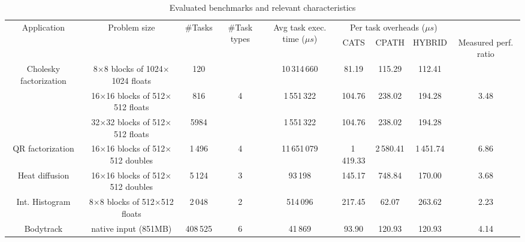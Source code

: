 \footnotesize
\begin{table}
\begin{center}
\caption{Evaluated benchmarks and relevant characteristics}
\label{tab.apps}
\begin{tabular}{|c|c|c|c|c|c|c|c|c|}
\hline
\multirow{2}{*}{\parbox{22mm}{\centering Application}} & 
\multirow{2}{*}{Problem size} & 
\multirow{2}{*}{\parbox{11mm}{\centering \#Tasks}} & 
\multirow{2}{*}{\parbox{9mm}{\centering \#Task types}} & 
\multirow{2}{*}{\parbox{18mm}{\centering Avg task exec. time (${\mu}s$)}} & 
\multicolumn{3}{|c|}{Per task overheads (${\mu}s$)} &\\
\cline{6-8}
& & & & & {\parbox{10mm}{\centering CATS}} & {\parbox{10mm}{\centering CPATH}} & {\parbox{10mm}{\centering HYBRID}} &

\multirow{2}{*}{\parbox{13mm}{\centering Measured perf. ratio}} \\
& & & & & & & & \\ %
\hline

\multirow{3}{*}{\parbox{25mm}{\centering Cholesky factorization}} & 
8$\times$8 blocks of 1024$\times$1024 floats & 120 & & 10\,314\,660 & 81.19 &  115.29 &  112.41 &  \\                                              & 16$\times$16 blocks of 512$\times$512 floats & 816 & 4 & 1\,551\,322 & 104.76 &  238.02 &  194.28 &3.48 \\ 
& 32$\times$32 blocks of 512$\times$512 floats & 5984 & & 1\,551\,322 & 104.76 &  238.02 &  194.28  & \\ 
\hline{}
QR factorization & 16$\times$16 blocks of 512$\times$512 doubles & 1\,496 & 4 & 11\,651\,079  &   1\,419.33 & 2\,580.41 &   1\,451.74 & 6.86 \\ 
\hline
Heat diffusion & 16$\times$16 blocks of 512$\times$512 doubles & 5\,124 & 3 & 93\,198  &   145.17  &  748.84 &  170.00& 3.68 \\
\hline
Int. Histogram & 8$\times$8 blocks of 512$\times$512 floats & 2\,048 & 2 & 514\,096 &  217.45 &  62.07 & 263.62  & 2.23 \\ 
\hline
Bodytrack & native input (851MB) & 408\,525 &  6 & 41\,869 & 93.90 & 120.93 &  120.93 & 4.14 \\
\hline
\end{tabular} 
\end{center}
\vspace{-0.4cm}
\end{table}
\normalsize

